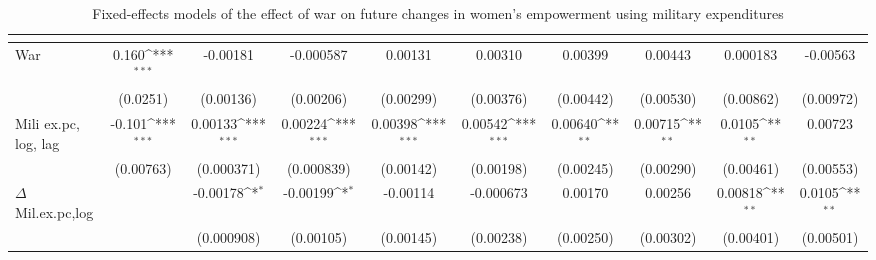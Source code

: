 \begin{table}[htbp]\centering
\def\sym#1{\ifmmode^{#1}\else\(^{#1}\)\fi}
\caption{Fixed-effects models of the effect of war on future changes in women’s empowerment using military expenditures \label{fepolemmilex}}
\begin{tabular}{l*{9}{c}}
\hline\hline
                    &&&&&&&&&\\
\hline
War             &       0.160\sym{***}&    -0.00181         &   -0.000587         &     0.00131         &     0.00310         &     0.00399         &     0.00443         &    0.000183         &    -0.00563         \\
                    &    (0.0251)         &   (0.00136)         &   (0.00206)         &   (0.00299)         &   (0.00376)         &   (0.00442)         &   (0.00530)         &   (0.00862)         &   (0.00972)         \\
[1em]
Mili ex.pc, log, lag        &      -0.101\sym{***}&     0.00133\sym{***}&     0.00224\sym{***}&     0.00398\sym{***}&     0.00542\sym{***}&     0.00640\sym{**} &     0.00715\sym{**} &      0.0105\sym{**} &     0.00723         \\
                    &   (0.00763)         &  (0.000371)         &  (0.000839)         &   (0.00142)         &   (0.00198)         &   (0.00245)         &   (0.00290)         &   (0.00461)         &   (0.00553)         \\
[1em]
$\Delta$Mil.ex.pc,log        &                     &    -0.00178\sym{*}  &    -0.00199\sym{*}  &    -0.00114         &   -0.000673         &     0.00170         &     0.00256         &     0.00818\sym{**} &      0.0105\sym{**} \\
                    &                     &  (0.000908)         &   (0.00105)         &   (0.00145)         &   (0.00238)         &   (0.00250)         &   (0.00302)         &   (0.00401)         &   (0.00501)         \\

\end{tabular}
\end{table}
